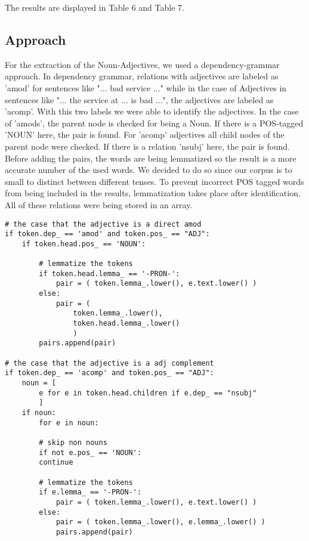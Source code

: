 The results are displayed in Table 6 and Table 7.
\subsection{Approach}
For the extraction of the Noun-Adjectives, we used a dependency-grammar approach. In dependency grammar, relations with adjectives are labeled as 'amod' for sentences like "... bad service ..." while in the case of Adjectives in sentences like "... the service at ... is bad ...", the adjectives are labeled as 'acomp'. With this two labels we were able to identify the adjectives. In the case of 'amods', the parent node is checked for being a Noun. If there is a POS-tagged 'NOUN' here, the pair is found. For 'acomp' adjectives all child nodes of the parent node were checked. If there is a relation 'nsubj' here, the pair is found. Before adding the pairs, the words are being lemmatized so the result is a more accurate number of the used words. We decided to do so since our corpus is to small to distinct between different tenses. To prevent incorrect POS tagged words from being included in the results, lemmatization takes place after identification. All of these relations were being stored in an array.\\
\begin{Verbatim}[fontsize=\tiny]
# the case that the adjective is a direct amod
if token.dep_ == 'amod' and token.pos_ == "ADJ":
	if token.head.pos_ == 'NOUN':

		# lemmatize the tokens
		if token.head.lemma_ == '-PRON-':
			pair = ( token.lemma_.lower(), e.text.lower() )
		else:
			pair = ( 
				token.lemma_.lower(), 
				token.head.lemma_.lower() 
				)
		pairs.append(pair)

# the case that the adjective is a adj complement
if token.dep_ == 'acomp' and token.pos_ == "ADJ":
	noun = [
		e for e in token.head.children if e.dep_ == "nsubj"
		]
	if noun:
		for e in noun:

		# skip non nouns
		if not e.pos_ == 'NOUN':
		continue

		# lemmatize the tokens
		if e.lemma_ == '-PRON-':
			pair = ( token.lemma_.lower(), e.text.lower() )
		else:
			pair = ( token.lemma_.lower(), e.lemma_.lower() )
			pairs.append(pair)
\end{Verbatim}

